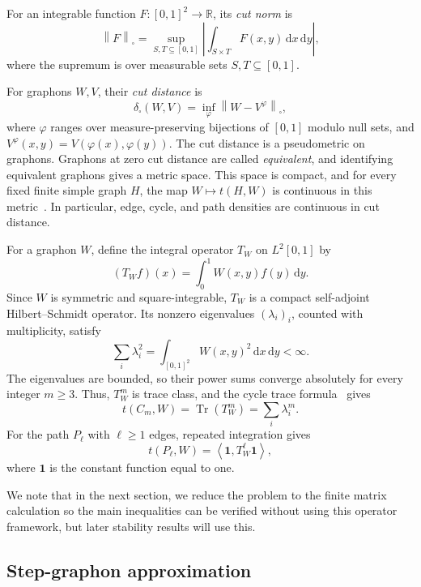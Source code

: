 \documentclass[11pt]{article}
\theoremstyle{remark}
\numberwithin{equation}{section}
\newcommand{\one}{\mathbf 1}
\newcommand{\R}{\mathbb R}
\newcommand{\ip}[2]{\left\langle #1,#2\right\rangle}
\newcommand{\norm}[1]{\left\lVert #1\right\rVert}
\newcommand{\Tr}{\operatorname{Tr}}
\newcommand{\dd}{\,\mathrm d}
\newcommand{\dens}[2]{t(#1,#2)}
\newcommand{\tC}[2]{t(C_{#1},#2)}
\newcommand{\tP}[2]{t(P_{#1},#2)}
\newcommand{\Tker}[1]{T_{#1}}
\newcommand{\intsq}{\int_{[0,1]^2}}
\newcommand{\ddxy}{\dd x\dd y}
\begin{document}
For an integrable function $F\colon[0,1]^2\to\R$, its \emph{cut norm} is
\[
  \norm F_\square=\sup_{S,T\subseteq[0,1]}
    \left|\int_{S\times T}F(x,y)\ddxy\right|,
\]
where the supremum is over measurable sets $S,T\subseteq[0,1]$.

For graphons $W,V$, their \emph{cut distance} is
\begin{equation}\label{eq:cut-distance}
  \delta_\square(W,V)=\inf_\varphi\norm{W-V^\varphi}_\square,
\end{equation}
where $\varphi$ ranges over measure-preserving bijections of $[0,1]$ modulo null sets, and $V^\varphi(x,y)=V(\varphi(x),\varphi(y))$.
The cut distance is a pseudometric on graphons.
Graphons at zero cut distance are called \emph{equivalent}, and identifying equivalent graphons gives a metric space.
This space is compact, and for every fixed finite simple graph $H$, the map $W\mapsto\dens HW$ is continuous in this metric~\cite{borgs2008convergent,lovasz2012large}.
In particular, edge, cycle, and path densities are continuous in cut distance.

For a graphon $W$, define the integral operator $\Tker W$ on $L^2[0,1]$ by
\[
  (\Tker Wf)(x)=\int_0^1 W(x,y)f(y)\dd y.
\]
Since $W$ is symmetric and square-integrable, $\Tker W$ is a compact self-adjoint Hilbert--Schmidt operator.
Its nonzero eigenvalues $(\lambda_i)_i$, counted with multiplicity, satisfy
\begin{equation}\label{eq:graphon-hilbert-schmidt}
  \sum_i\lambda_i^2=\intsq W(x,y)^2\ddxy<\infty.
\end{equation}
The eigenvalues are bounded, so their power sums converge absolutely for every integer $m\ge3$.
Thus, $\Tker W^m$ is trace class, and the cycle trace formula~\cite{lovasz2012large} gives
\begin{equation}\label{eq:graphon-cycle-trace}
  \tC mW=\Tr(\Tker W^m)=\sum_i\lambda_i^m.
\end{equation}
For the path $P_\ell$ with $\ell\ge1$ edges, repeated integration gives
\begin{equation}\label{eq:graphon-path-operator}
  \tP\ell W=\ip\one{\Tker W^\ell\one},
\end{equation}
where $\one$ is the constant function equal to one.

We note that in the next section, we reduce the problem to the finite matrix calculation so the main inequalities can be verified without using this operator framework, but later stability results will use this.

\subsection{Step-graphon approximation}
\label{subsec:step-approximation}
\end{document}
